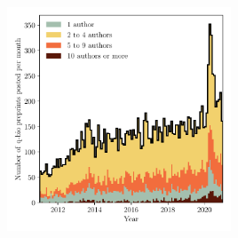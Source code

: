 \documentclass{nature}
\makeatletter
\renewenvironment*{figure}{\@float{figure}}{\end@float}
\newcommand{\arxiv}{arXiv}
\makeatother
\begin{document}
 
  \begin{figure}
  	\centering
     \includegraphics[width=0.5\textwidth]{q-bio-pre-prints-segmented-by-author-count}
     \caption{The increase in quantitative biology pre-prints in 2020 cannot be attributed to large collaborations. Here we segment q-bio pre-prints by the number of authors, showing that in 2020 a sharp increase was observed for single-author papers and small (2-4 authors) collaborations.}
     \label{fig:q-bio-pre-prints-segmented-by-author-count}
  \end{figure}






\end{document}
